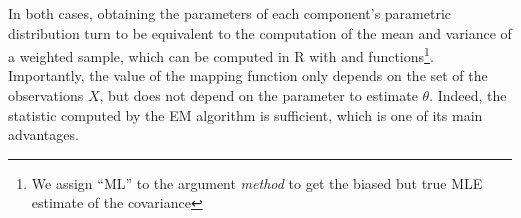 \begin{table}[!h]

\caption{\label{tab:summary-em-pdf}An overview of the practical implementation of the EM algorithm in GMMs.}
\centering
{}
\end{table}

In both cases, obtaining the parameters of each component's parametric distribution
turn to be equivalent to the computation of the mean and variance of a weighted sample, which can be computed in R with  and
 functions\footnote{We assign ``ML'' to the argument \emph{method} to get the biased but true MLE estimate of the covariance}. Importantly, the value of the mapping function only depends on the set of the observations \(X\), but does not depend on the parameter to estimate \(\theta\). Indeed, the statistic computed by the EM algorithm is sufficient, which is one of its main advantages.

